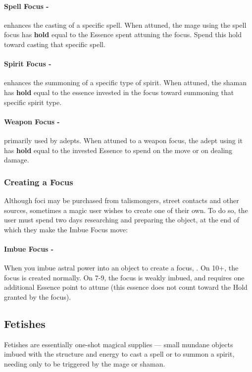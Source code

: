 \paragraph{Spell Focus -} enhances the casting of a specific spell. When attuned, the mage using the spell focus has \textsf{\textbf{hold}} equal to the Essence spent attuning the focus. Spend this hold toward casting that specific spell.

\paragraph{Spirit Focus -} enhances the summoning of a specific type of spirit. When attuned, the shaman has \textsf{\textbf{hold}} equal to the essence invested in the focus toward summoning that specific spirit type.

\paragraph{Weapon Focus -} primarily used by adepts. When attuned to a weapon focus, the adept using it has \textsf{\textbf{hold}} equal to the invested Essence to spend on the  move or on dealing damage.

\subsubsection{Creating a Focus}
Although foci may be purchased from talismongers, street contacts and other sources, sometimes a magic user wishes to create one of their own. To do so, the user must spend two days researching and preparing the object, at the end of which they make the Imbue Focus move:

\paragraph{Imbue Focus -} When you imbue astral power into an object to create a focus, . On 10+, the focus is created normally. On 7-9, the focus is weakly imbued, and requires one additional Essence point to attune (this essence does not count toward the Hold granted by the focus).


\subsection{Fetishes}

Fetishes are essentially one-shot magical supplies — small mundane objects imbued with the structure and energy to cast a spell or to summon a spirit, needing only to be triggered by the mage or shaman.


